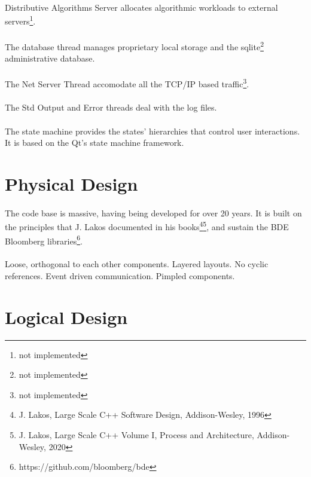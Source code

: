 \paragraph{}
Distributive Algorithms Server allocates algorithmic workloads to external servers\footnote{not implemented}.
\paragraph{}
The database thread manages proprietary local storage and the sqlite\footnote{not implemented} administrative database.
\paragraph{}
The Net Server Thread accomodate all the TCP/IP based traffic\footnote{not implemented}.
\paragraph{}
The Std Output and Error threads deal with the log files.
\paragraph{}
The state machine provides the states' hierarchies that control user interactions. It is based on the Qt's state machine framework.
\section{Physical Design}
\paragraph{}
The code base is massive, having being developed for over 20 years. It is built on the principles that J. Lakos documented in his books\footnote{J. Lakos, Large Scale C++ Software Design, Addison-Wesley, 1996}\footnote{J. Lakos, Large Scale C++ Volume I, Process and Architecture, Addison-Wesley, 2020}, and sustain the BDE Bloomberg libraries\footnote{https://github.com/bloomberg/bde}. 
\paragraph{}
Loose, orthogonal to each other components. Layered layouts. No cyclic references. Event driven communication. Pimpled components.
\section{Logical Design}
